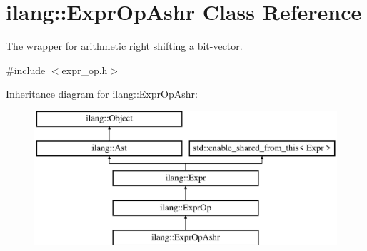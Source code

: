 \hypertarget{classilang_1_1_expr_op_ashr}{}\section{ilang\+:\+:Expr\+Op\+Ashr Class Reference}
\label{classilang_1_1_expr_op_ashr}


The wrapper for arithmetic right shifting a bit-\/vector.  




{\ttfamily \#include $<$expr\+\_\+op.\+h$>$}

Inheritance diagram for ilang\+:\+:Expr\+Op\+Ashr\+:\begin{figure}[H]
\begin{center}
\leavevmode
\includegraphics[height=5.000000cm]{classilang_1_1_expr_op_ashr}
\end{center}
\end{figure}
